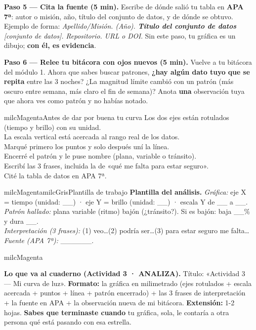 \documentclass[11pt,letterpaper]{article}
\newcommand{\checkbox}{\textcolor{milcGradeDark}{\fbox{\phantom{x}}}\hspace{5pt}}
\newcommand{\milcpaso}[3]{%
\Needspace{4\baselineskip}%
\begin{tcolorbox}[enhanced,colback=white,colframe=milcLinea,arc=1.5mm,boxrule=.9pt,
  left=14mm,right=4mm,top=3mm,bottom=3mm,before skip=4pt,after skip=4pt,
  fontupper=\RaggedRight,
  overlay={\node[anchor=north west,circle,fill=#2,text=white,inner sep=0pt,
    minimum size=7.4mm,font=\sffamily\bfseries\small]
    at ([xshift=3.6mm,yshift=-3.2mm]frame.north west) {#1};}]
#3
\end{tcolorbox}}
\begin{document}
\milcpaso{5}{milcMagenta}{\textbf{Paso 5 --- Cita la fuente (5 min).} Escribe de dónde salió tu tabla en \textbf{APA 7ª}: autor o misión, año, título del conjunto de datos, y de dónde se obtuvo. Ejemplo de forma: \emph{Apellido/Misión. (Año). \textbf{Título del conjunto de datos} [conjunto de datos]. Repositorio. URL o DOI}. Sin este paso, tu gráfica es un dibujo; \textbf{con él, es evidencia}.}
\milcpaso{6}{milcMagenta}{\textbf{Paso 6 --- Relee tu bitácora con ojos nuevos (5 min).} Vuelve a tu bitácora del módulo 1. Ahora que sabes buscar patrones, \textbf{¿hay algún dato tuyo que se repita} entre las 3 noches? ¿La magnitud límite cambió con un patrón (más oscuro entre semana, más claro el fin de semana)? Anota \textbf{una} observación tuya que ahora ves como patrón y no habías notado.}

\begin{drawbox}{milcMagenta}{Antes de dar por buena tu curva}
\checkbox Los dos ejes están rotulados (tiempo y brillo) con su unidad. \\[1mm]
\checkbox La escala vertical está acercada al rango real de los datos. \\[1mm]
\checkbox Marqué primero los puntos y solo después uní la línea. \\[1mm]
\checkbox Encerré el patrón y le puse nombre (plana, variable o tránsito). \\[1mm]
\checkbox Escribí las 3 frases, incluida la de «qué me falta para estar seguro». \\[1mm]
\checkbox Cité la tabla de datos en APA 7ª.
\end{drawbox}

\begin{softbox}{milcMagenta}{milcGris}{Plantilla de trabajo}
\textbf{Plantilla del análisis.} \textit{Gráfica:} eje X = tiempo (unidad: \_\_) · eje Y = brillo (unidad: \_\_) · escala Y de \_\_ a \_\_. \\[1mm]
\textit{Patrón hallado:} \checkbox plana \quad \checkbox variable (ritmo) \quad \checkbox bajón (¿tránsito?). Si es bajón: baja \_\_\% y dura \_\_. \\[1mm]
\textit{Interpretación (3 frases):} (1) veo\ldots (2) podría ser\ldots (3) para estar seguro me falta\ldots \\[1mm]
\textit{Fuente (APA 7ª):} \_\_\_\_\_\_.
\end{softbox}

\begin{infoband}{milcMagenta}


\textbf{Lo que va al cuaderno (Actividad 3 · ANALIZA).} Título: «Actividad 3 --- Mi curva de luz». \textbf{Formato:} la gráfica en milimetrado (ejes rotulados + escala acercada + puntos + línea + patrón encerrado) + las 3 frases de interpretación + la fuente en APA + la observación nueva de mi bitácora. \textbf{Extensión:} 1-2 hojas. \textbf{Sabes que terminaste cuando} tu gráfica, sola, le contaría a otra persona qué está pasando con esa estrella.
\end{infoband}
\end{document}
